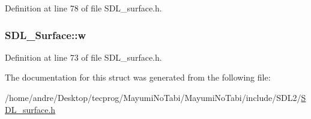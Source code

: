 Definition at line 78 of file S\-D\-L\-\_\-surface.\-h.

\hypertarget{struct_s_d_l___surface_a9b0ec7185dcdb2a3530a9160a6ea83d9}{
\subsubsection[{w}]{ S\-D\-L\-\_\-\-Surface\-::w}}\label{struct_s_d_l___surface_a9b0ec7185dcdb2a3530a9160a6ea83d9}


Definition at line 73 of file S\-D\-L\-\_\-surface.\-h.



The documentation for this struct was generated from the following file\-:\begin{DoxyCompactItemize}
\item 
/home/andre/\-Desktop/tecprog/\-Mayumi\-No\-Tabi/\-Mayumi\-No\-Tabi/include/\-S\-D\-L2/\hyperlink{_s_d_l__surface_8h}{S\-D\-L\-\_\-surface.\-h}\end{DoxyCompactItemize}
